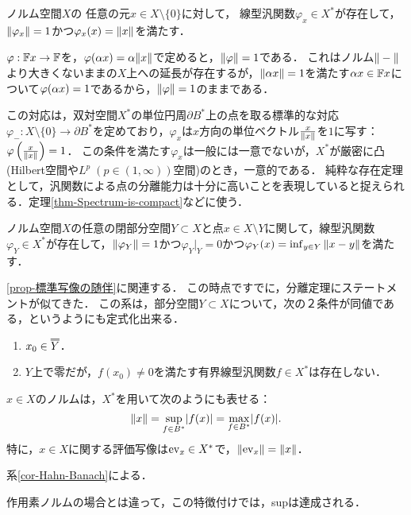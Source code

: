 \documentclass[uplatex,dvipdfmx]{jsreport}
\begin{document}
\begin{corollary}[汎関数の構成]\label{cor-Hahn-Banach}
    ノルム空間$X$の
    任意の元$x\in X\setminus\{0\}$に対して，
    線型汎関数$\varphi_x\in X^*$が存在して，$\|\varphi_x\|=1$かつ$\varphi_x(x)=\|x\|$を満たす．
\end{corollary}
\begin{Proof}
    $\varphi:\mathbb{F} x\to\mathbb{F}$を，$\varphi(\alpha x)=\alpha\|x\|$で定めると，$\|\varphi\|=1$である．
    これはノルム$\|-\|$より大きくないままの$X$上への延長が存在するが，$\|\alpha x\|=1$を満たす$\alpha x\in\mathbb{F} x$について$\varphi(\alpha x)=1$であるから，$\|\varphi\|=1$のままである．
\end{Proof}
\begin{remarks}
    この対応は，双対空間$X^*$の単位円周$\partial B^*$上の点を取る標準的な対応$\varphi_-:X\setminus\{0\}\to\partial B^*$を定めており，$\varphi_x$は$x$方向の単位ベクトル$\frac{x}{\|x\|}$を$1$に写す：$\varphi\left(\frac{x}{\|x\|}\right)=1$．
    この条件を満たす$\varphi_x$は一般には一意でないが，$X^*$が厳密に凸(Hilbert空間や$L^p\;(p\in(1,\infty))$空間)のとき，一意的である．
    純粋な存在定理として，汎関数による点の分離能力は十分に高いことを表現していると捉えられる．定理\ref{thm-Spectrum-is-compact}などに使う．
\end{remarks}

\begin{corollary}[閉部分空間からの距離関数]\label{cor-distance-from-closed-subspace}
    ノルム空間$X$の任意の閉部分空間$Y\subset X$と点$x\in X\setminus Y$に関して，線型汎関数$\varphi_Y\in X^*$が存在して，$\|\varphi_Y\|=1$かつ$\varphi_Y|_Y=0$かつ$\varphi_Y(x)=\inf_{y\in Y}\|x-y\|$を満たす．
\end{corollary}
\begin{remarks}
    \ref{prop-標準写像の随伴}に関連する．
    この時点ですでに，分離定理にステートメントが似てきた．
    この系は，部分空間$Y\subset X$について，次の２条件が同値である，というようにも定式化出来る．
    \begin{enumerate}
        \item $x_0\in \oo{Y}$．
        \item $Y$上で零だが，$f(x_0)\ne0$を満たす有界線型汎関数$f\in X^*$は存在しない．
    \end{enumerate}
\end{remarks}

\begin{corollary}[作用素ノルムの双対空間による特徴付け]
    $x\in X$のノルムは，$X^*$を用いて次のようにも表せる：
    \[\|x\|=\sup_{f\in B^*}\lvert f(x)\rvert=\max_{f\in B^*}\lvert f(x)\rvert.\]
    特に，$x\in X$に関する評価写像は$\mathrm{ev}_x\in X^*$で，$\|\mathrm{ev}_x\|=\|x\|$．
\end{corollary}
\begin{Proof}
    系\ref{cor-Hahn-Banach}による．
\end{Proof}
\begin{remarks}
    作用素ノルムの場合とは違って，この特徴付けでは，supは達成される．
\end{remarks}
\end{document}
